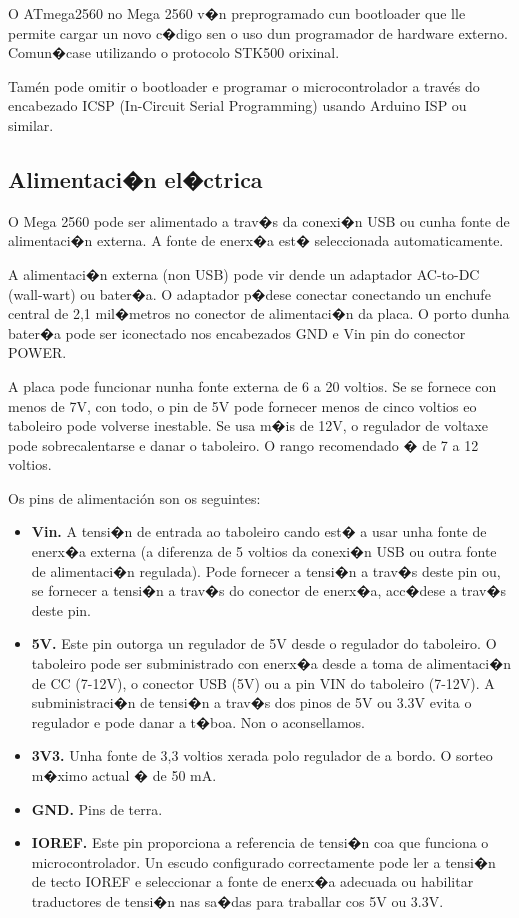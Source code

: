 \documentclass[11pt,twoside]{book}
\begin{document}
O ATmega2560 no Mega 2560 v�n preprogramado cun bootloader que lle permite cargar un novo c�digo sen o uso dun programador de hardware externo. Comun�case utilizando o protocolo STK500 orixinal.

Tamén pode omitir o bootloader e programar o microcontrolador a través do encabezado ICSP (In-Circuit Serial Programming) usando Arduino ISP ou similar.

\subsection{Alimentaci�n el�ctrica}

O Mega 2560 pode ser alimentado a trav�s da conexi�n USB ou cunha fonte de alimentaci�n externa. A fonte de enerx�a est� seleccionada automaticamente. 

A alimentaci�n externa (non USB) pode vir dende un adaptador AC-to-DC (wall-wart) ou bater�a. O adaptador p�dese conectar conectando un enchufe central de 2,1 mil�metros no conector de alimentaci�n da placa. O porto dunha bater�a pode ser iconectado nos encabezados GND e Vin pin do conector POWER. 

A placa pode funcionar nunha fonte externa de 6 a 20 voltios. Se se fornece con menos de 7V, con todo, o pin de 5V pode fornecer menos de cinco voltios eo taboleiro pode volverse inestable. Se usa m�is de 12V, o regulador de voltaxe pode sobrecalentarse e danar o taboleiro. O rango recomendado � de 7 a 12 voltios.

Os pins de alimentación son os seguintes:

\begin{itemize}
\item \textbf{Vin.} A tensi�n de entrada ao taboleiro cando est� a usar unha fonte de enerx�a externa (a diferenza de 5 voltios da conexi�n USB ou outra fonte de alimentaci�n regulada). Pode fornecer a tensi�n a trav�s deste pin ou, se fornecer a tensi�n a trav�s do conector de enerx�a, acc�dese a trav�s deste pin.
\item \textbf{5V.} Este pin outorga un regulador de 5V desde o regulador do taboleiro. O taboleiro pode ser subministrado con enerx�a desde a toma de alimentaci�n de CC (7-12V), o conector USB (5V) ou a pin VIN do taboleiro (7-12V). A subministraci�n de tensi�n a trav�s dos pinos de 5V ou 3.3V evita o regulador e pode danar a t�boa. Non o aconsellamos.
\item \textbf{3V3.} Unha fonte de 3,3 voltios xerada polo regulador de a bordo. O sorteo m�ximo actual � de 50 mA.
\item \textbf{GND.} Pins de terra.
\item \textbf{IOREF.} Este pin proporciona a referencia de tensi�n coa que funciona o microcontrolador. Un escudo configurado correctamente pode ler a tensi�n de tecto IOREF e seleccionar a fonte de enerx�a adecuada ou habilitar traductores de tensi�n nas sa�das para traballar cos 5V ou 3.3V.
\end{itemize}
\end{document}
